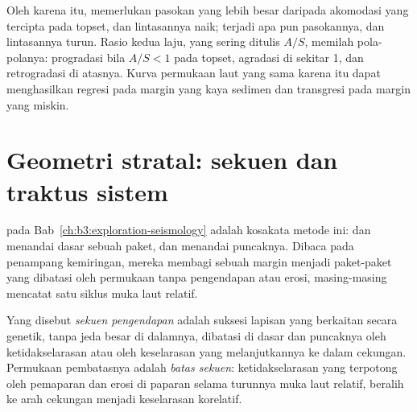 Oleh karena itu,  memerlukan pasokan yang lebih besar daripada akomodasi
yang tercipta pada topset, dan lintasannya naik;  terjadi
apa pun pasokannya, dan lintasannya turun. Rasio kedua laju,
yang sering ditulis $A/S$, memilah pola-polanya: progradasi bila $A/S < 1$ pada
topset, agradasi di sekitar 1, dan retrogradasi di atasnya. Kurva permukaan laut yang sama
karena itu dapat menghasilkan regresi pada margin yang kaya sedimen dan
transgresi pada margin yang miskin.

\section{Geometri stratal: sekuen dan traktus sistem}\label{sec:b3:sequence-stratigraphy:sequences}

 pada Bab~\ref{ch:b3:exploration-seismology}
adalah kosakata metode ini:  dan  menandai dasar sebuah
paket,  dan  menandai puncaknya. Dibaca pada penampang kemiringan, mereka
membagi sebuah margin menjadi paket-paket yang dibatasi oleh permukaan tanpa pengendapan atau
erosi, masing-masing mencatat satu siklus muka laut relatif.

\begin{definition}\label{def:b3:sequence-stratigraphy:sequence}
Yang disebut \emph{sekuen pengendapan} adalah suksesi lapisan yang
berkaitan secara genetik, tanpa jeda besar di dalamnya, dibatasi di dasar
dan puncaknya oleh ketidakselarasan atau oleh keselarasan yang melanjutkannya ke
dalam cekungan. Permukaan pembatasnya adalah \emph{batas
sekuen}: ketidakselarasan yang terpotong oleh pemaparan dan
erosi di paparan selama turunnya muka laut relatif, beralih ke arah
cekungan menjadi keselarasan korelatif.
\end{definition}

